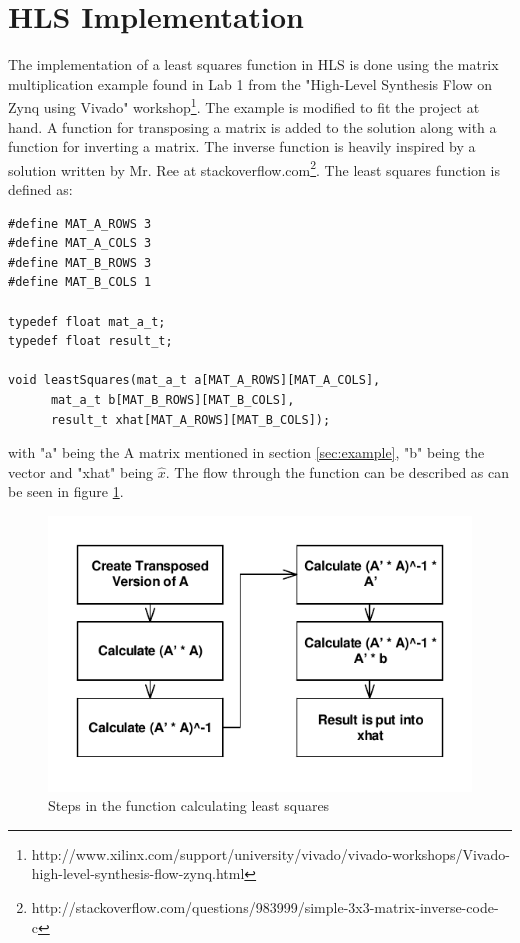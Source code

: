 \section{HLS Implementation}
The implementation of a least squares function in HLS is done using the matrix multiplication example found in Lab 1 from the "High-Level Synthesis Flow on Zynq using Vivado" workshop\footnote{http://www.xilinx.com/support/university/vivado/vivado-workshops/Vivado-high-level-synthesis-flow-zynq.html}. The example is modified to fit the project at hand. A function for transposing a matrix is added to the solution along with a function for inverting a matrix. The inverse function is heavily inspired by a solution written by Mr. Ree at stackoverflow.com\footnote{http://stackoverflow.com/questions/983999/simple-3x3-matrix-inverse-code-c}.
The least squares function is defined as:
\begin{lstlisting}[caption={Least Squares function definition},label=lstsquares]
#define MAT_A_ROWS 3
#define MAT_A_COLS 3
#define MAT_B_ROWS 3
#define MAT_B_COLS 1

typedef float mat_a_t;
typedef float result_t;

void leastSquares(mat_a_t a[MAT_A_ROWS][MAT_A_COLS],
      mat_a_t b[MAT_B_ROWS][MAT_B_COLS],
      result_t xhat[MAT_A_ROWS][MAT_B_COLS]);
\end{lstlisting}
with "a" being the A matrix mentioned in section \ref{sec:example}, "b" being the vector and "xhat" being $\hat{x}$. The flow through the function can be described as can be seen in figure \ref{fig:LSFunc}.
\begin{figure}[H]
\centering
\includegraphics[scale=1]{billeder/leastSquaresFunc}
\caption{Steps in the function calculating least squares}
\label{fig:LSFunc}
\end{figure}

